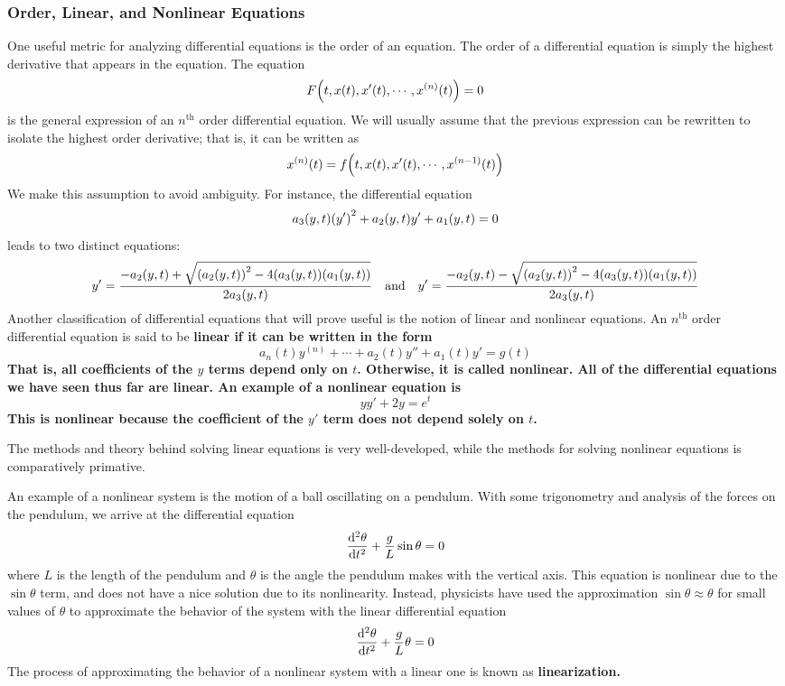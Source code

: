 \subsubsection{Order, Linear, and Nonlinear Equations}
One useful metric for analyzing differential equations is the order of an equation. The order of a differential equation is simply the highest derivative that appears in the equation. The equation
\[ F\pqty{t, x(t), x'(t), \cdots, x^{(n)}(t)} = 0\]
is the general expression of an $n^{\text{th}}$ order differential equation. We will usually assume that the previous expression can be rewritten to isolate the highest order derivative; that is, it can be written as
\[ x^{(n)}(t) = f\pqty{t, x(t), x'(t), \cdots, x^{(n-1)}(t)}\]
We make this assumption to avoid ambiguity. For instance, the differential equation
\[ a_3(y,t)\pqty{y'}^2 + a_2(y,t)y' + a_1(y,t) = 0\]
leads to two distinct equations:
\[ y' = \frac{-a_2(y,t) + \sqrt{\pqty{a_2(y,t)}^2-4\pqty{a_3(y,t)}\pqty{a_1(y,t)}}}{2a_3(y,t)}\quad\text{and}\quad y'=\frac{-a_2(y,t) - \sqrt{\pqty{a_2(y,t)}^2-4\pqty{a_3(y,t)}\pqty{a_1(y,t)}}}{2a_3(y,t)}\]
Another classification of differential equations that will prove useful is the notion of linear and nonlinear equations. An $n^{\text{th}}$ order differential equation is said to be \bf{linear} if it can be written in the form
\[ a_n(t)y^{(n)} + \cdots + a_2(t)y'' + a_1(t)y' = g(t) \]
That is, all coefficients of the $y$ terms depend only on $t$. Otherwise, it is called \bf{nonlinear}. All of the differential equations we have seen thus far are linear. An example of a nonlinear equation is
\[ y y' + 2y = e^t\]
This is nonlinear because the coefficient of the $y'$ term does not depend solely on $t$. \par
The methods and theory behind solving linear equations is very well-developed, while the methods for solving nonlinear equations is comparatively primative. \par
An example of a nonlinear system is the motion of a ball oscillating on a pendulum. With some trigonometry and analysis of the forces on the pendulum, we arrive at the differential equation
\[ \dv[2]{\theta}{t} + \frac{g}{L}\sin\theta = 0\]
where $L$ is the length of the pendulum and $\theta$ is the angle the pendulum makes with the vertical axis. This equation is nonlinear due to the $\sin\theta$ term, and does not have a nice solution due to its nonlinearity. Instead, physicists have used the approximation $\sin\theta \approx \theta$ for small values of $\theta$ to approximate the behavior of the system with the linear differential equation
\[ \dv[2]{\theta}{t} + \frac{g}{L}\theta = 0 \]
The process of approximating the behavior of a nonlinear system with a linear one is known as \bf{linearization}.
